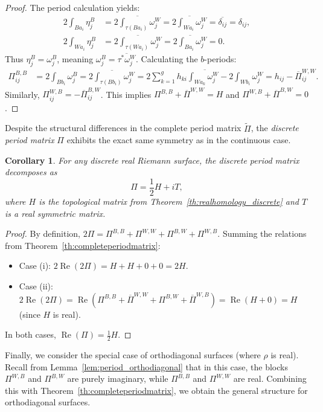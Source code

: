 \documentclass[11pt,a4paper]{article}
\newtheorem{corollary}[theorem]{Corollary}
\theoremstyle{definition}
\renewcommand{\Re}{\operatorname{Re}}
\begin{document}
\begin{proof}
	The period calculation yields:
	\begin{align*}
		2\int_{Ba_i} \eta_j^B &= \overline{2\int_{\tau(Ba_i)} \omega_j^W} = \overline{2\int_{Wa_i} \omega_j^W} = \overline{\delta_{ij}} = \delta_{ij},\\
		2\int_{Wa_i} \eta_j^B &= \overline{2\int_{\tau(Wa_i)} \omega_j^W} = \overline{2\int_{Ba_i} \omega_j^W} = 0.
	\end{align*}
	Thus $\eta_j^B = \omega_j^B$, meaning $\omega_j^B = \overline{\tau^* \omega_j^W}$.
	Calculating the $b$-periods:
	\begin{align*}
		\Pi_{ij}^{B,B} &= 2 \int_{Bb_i} \omega_j^B = \overline{2 \int_{\tau(Bb_i)} \omega_j^W}
		= \overline{2 \sum_{k=1}^{g} h_{ki}\int_{Wa_k}\omega_j^W - 2 \int_{Wb_i} \omega_j^W}
		= h_{ij} - \overline{\Pi}_{ij}^{W,W}.
	\end{align*}
	Similarly, $\Pi_{ij}^{W,B} = -\overline{\Pi}_{ij}^{B,W}$.
	This implies $\Pi^{B,B} + \overline{\Pi}^{W,W} = H$ and $\Pi^{W,B} + \overline{\Pi}^{B,W} = 0$.
\end{proof}

Despite the structural differences in the complete period matrix $\tilde{\Pi}$, the \emph{discrete period matrix} $\Pi$ exhibits the exact same symmetry as in the continuous case.

\begin{corollary}\label{cor:periodmatrix}
	For any discrete real Riemann surface, the discrete period matrix decomposes as
	\[ \Pi = \frac{1}{2} H + i T, \]
	where $H$ is the topological matrix from Theorem~\ref{th:realhomology_discrete} and $T$ is a real symmetric matrix.
\end{corollary}

\begin{proof}
	By definition, $2\Pi = \Pi^{B,B} + \Pi^{W,W} + \Pi^{B,W} + \Pi^{W,B}$.
	Summing the relations from Theorem~\ref{th:completeperiodmatrix}:
	\begin{itemize}
		\item Case (i): $2\Re(2\Pi) = H + H + 0 + 0 = 2H$.
		\item Case (ii): $2\Re(2\Pi) = \Re(\Pi^{B,B} + \overline{\Pi}^{W,W} + \Pi^{B,W} + \overline{\Pi}^{W,B}) = \Re(H + 0) = H$ (since $H$ is real).
	\end{itemize}
	In both cases, $\Re(\Pi) = \frac{1}{2}H$.
\end{proof}

Finally, we consider the special case of orthodiagonal surfaces (where $\rho$ is real). Recall from Lemma~\ref{lem:period_orthodiagonal} that in this case, the blocks $\Pi^{W,B}$ and $\Pi^{B,W}$ are purely imaginary, while $\Pi^{B,B}$ and $\Pi^{W,W}$ are real.
Combining this with Theorem~\ref{th:completeperiodmatrix}, we obtain the general structure for orthodiagonal surfaces.
\end{document}
